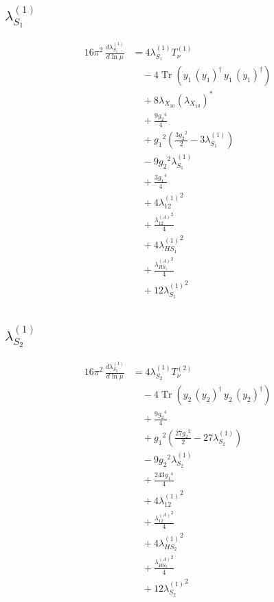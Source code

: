 \documentclass[10pt,a4paper]{article}
\begin{document}
\subsection*{$\lambda_{S_1}^{(1)}$}
\begin{align*}
16\pi^2\,\frac{d \lambda_{S_1}^{(1)}}{d\ln\mu} &=4 {\lambda_{S_1}^{(1)}} T_{\nu}^{(1)} \\
&\quad -4 \operatorname{Tr}\!\left({y_1}\,\left({y_1}\right)^{\dagger}\,{y_1}\,\left({y_1}\right)^{\dagger}\right) \\
&\quad +8 {\lambda_{X_{10}}} \left({\lambda_{X_{10}}}\right)^{*} \\
&\quad +\frac{9 {g_2}^4}{4} \\
&\quad +{g_1}^2 \left(\frac{3 {g_2}^2}{2}-3 {\lambda_{S_1}^{(1)}}\right) \\
&\quad -9 {g_2}^2 {\lambda_{S_1}^{(1)}} \\
&\quad +\frac{3 {g_1}^4}{4} \\
&\quad +4 {\lambda_{12}^{(1)}}^2 \\
&\quad +\frac{{\lambda_{12}^{(A)}}^2}{4} \\
&\quad +4 {\lambda_{HS_1}^{(1)}}^2 \\
&\quad +\frac{{\lambda_{HS_1}^{(A)}}^2}{4} \\
&\quad +12 {\lambda_{S_1}^{(1)}}^2 \\
\end{align*}
\subsection*{$\lambda_{S_2}^{(1)}$}
\begin{align*}
16\pi^2\,\frac{d \lambda_{S_2}^{(1)}}{d\ln\mu} &=4 {\lambda_{S_2}^{(1)}} T_{\nu}^{(2)} \\
&\quad -4 \operatorname{Tr}\!\left({y_2}\,\left({y_2}\right)^{\dagger}\,{y_2}\,\left({y_2}\right)^{\dagger}\right) \\
&\quad +\frac{9 {g_2}^4}{4} \\
&\quad +{g_1}^2 \left(\frac{27 {g_2}^2}{2}-27 {\lambda_{S_2}^{(1)}}\right) \\
&\quad -9 {g_2}^2 {\lambda_{S_2}^{(1)}} \\
&\quad +\frac{243 {g_1}^4}{4} \\
&\quad +4 {\lambda_{12}^{(1)}}^2 \\
&\quad +\frac{{\lambda_{12}^{(A)}}^2}{4} \\
&\quad +4 {\lambda_{HS_2}^{(1)}}^2 \\
&\quad +\frac{{\lambda_{HS_2}^{(A)}}^2}{4} \\
&\quad +12 {\lambda_{S_2}^{(1)}}^2 \\
\end{align*}
\end{document}
